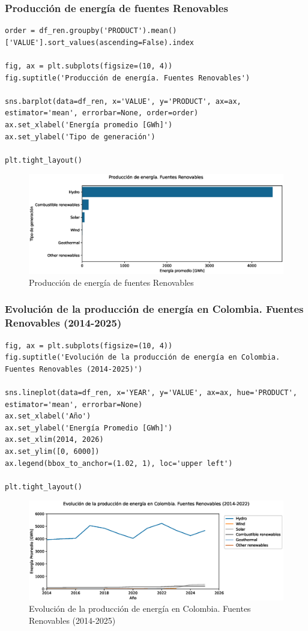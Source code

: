 \documentclass{article}
\begin{document}
\subsubsection{Producción de energía de fuentes Renovables}

\begin{verbatim}
order = df_ren.groupby('PRODUCT').mean()['VALUE'].sort_values(ascending=False).index

fig, ax = plt.subplots(figsize=(10, 4))
fig.suptitle('Producción de energía. Fuentes Renovables')

sns.barplot(data=df_ren, x='VALUE', y='PRODUCT', ax=ax, estimator='mean', errorbar=None, order=order)
ax.set_xlabel('Energía promedio [GWh]')
ax.set_ylabel('Tipo de generación')

plt.tight_layout()	
\end{verbatim}

\begin{figure}[t]
	\centering
	\includegraphics[width=0.7\linewidth]{fig_12}
	\caption{Producción de energía de fuentes Renovables}
	\label{fig:fig12}
\end{figure}


\subsubsection{Evolución de la producción de energía en Colombia. Fuentes Renovables (2014-2025)}

\begin{verbatim}
fig, ax = plt.subplots(figsize=(10, 4))
fig.suptitle('Evolución de la producción de energía en Colombia. Fuentes Renovables (2014-2025)')

sns.lineplot(data=df_ren, x='YEAR', y='VALUE', ax=ax, hue='PRODUCT', estimator='mean', errorbar=None)
ax.set_xlabel('Año')
ax.set_ylabel('Energía Promedio [GWh]')
ax.set_xlim(2014, 2026)
ax.set_ylim([0, 6000])
ax.legend(bbox_to_anchor=(1.02, 1), loc='upper left')

plt.tight_layout()	
\end{verbatim}

\begin{figure}[t]
	\centering
	\includegraphics[width=0.7\linewidth]{fig_13}
	\caption{Evolución de la producción de energía en Colombia. Fuentes Renovables (2014-2025)}
	\label{fig:fig13}
\end{figure}
\end{document}
